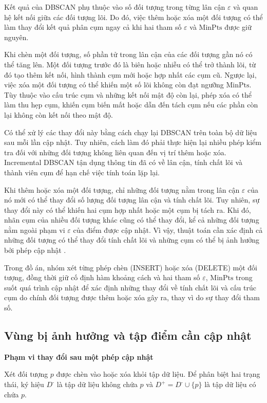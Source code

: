Kết quả của DBSCAN phụ thuộc vào số đối tượng trong từng lân cận \(\varepsilon\) và quan hệ kết nối giữa các đối tượng lõi. Do đó, việc thêm hoặc xóa một đối tượng có thể làm thay đổi kết quả phân cụm ngay cả khi hai tham số \(\varepsilon\) và \(\mathrm{MinPts}\) được giữ nguyên.

Khi chèn một đối tượng, số phần tử trong lân cận của các đối tượng gần nó có thể tăng lên. Một đối tượng trước đó là biên hoặc nhiễu có thể trở thành lõi, từ đó tạo thêm kết nối, hình thành cụm mới hoặc hợp nhất các cụm cũ. Ngược lại, việc xóa một đối tượng có thể khiến một số lõi không còn đạt ngưỡng \(\mathrm{MinPts}\). Tùy thuộc vào cấu trúc cụm và những kết nối mật độ còn lại, phép xóa có thể làm thu hẹp cụm, khiến cụm biến mất hoặc dẫn đến tách cụm nếu các phần còn lại không còn kết nối theo mật độ.

Có thể xử lý các thay đổi này bằng cách chạy lại DBSCAN trên toàn bộ dữ liệu sau mỗi lần cập nhật. Tuy nhiên, cách làm đó phải thực hiện lại nhiều phép kiểm tra đối với những đối tượng không liên quan đến vị trí thêm hoặc xóa. Incremental DBSCAN tận dụng thông tin đã có về lân cận, tính chất lõi và thành viên cụm để hạn chế việc tính toán lặp lại.

Khi thêm hoặc xóa một đối tượng, chỉ những đối tượng nằm trong lân cận \(\varepsilon\) của nó mới có thể thay đổi số lượng đối tượng lân cận và tính chất lõi. Tuy nhiên, sự thay đổi này có thể khiến hai cụm hợp nhất hoặc một cụm bị tách ra. Khi đó, nhãn cụm của nhiều đối tượng khác cũng có thể thay đổi, kể cả những đối tượng nằm ngoài phạm vi \(\varepsilon\) của điểm được cập nhật. Vì vậy, thuật toán cần xác định cả những đối tượng có thể thay đổi tính chất lõi và những cụm có thể bị ảnh hưởng bởi phép cập nhật \parencite{ester1998incrementaldbscan}.

Trong đồ án, nhóm xét từng phép chèn (INSERT) hoặc xóa (DELETE) một đối tượng, đồng thời giữ cố định hàm khoảng cách và hai tham số \(\varepsilon\), \(\mathrm{MinPts}\) trong suốt quá trình cập nhật để xác định những thay đổi về tính chất lõi và cấu trúc cụm do chính đối tượng được thêm hoặc xóa gây ra, thay vì do sự thay đổi tham số.

\subsection{Vùng bị ảnh hưởng và tập điểm cần cập nhật}

\textbf{Phạm vi thay đổi sau một phép cập nhật}

Xét đối tượng \(p\) được chèn vào hoặc xóa khỏi tập dữ liệu. Để phân biệt hai trạng thái, ký hiệu \(D^{\text{-}}\) là tập dữ liệu không chứa \(p\) và \(D^{+}=D^{\text{-}}\cup\{p\}\) là tập dữ liệu có chứa \(p\).

